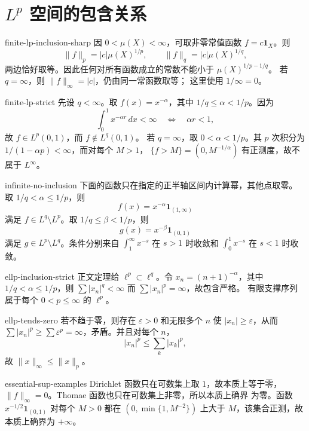 \chapter{\texorpdfstring{\(L^p\)}{Lp} 空间的包含关系}

\begin{solution}{finite-lp-inclusion-sharp}
因 \(0<\mu(X)<\infty\)，可取非零常值函数
\(f=c\mathbf1_X\)。则
\[
 \|f\|_p=|c|\mu(X)^{1/p},\qquad
 \|f\|_q=|c|\mu(X)^{1/q},
\]
两边恰好取等。因此任何对所有函数成立的常数不能小于
\(\mu(X)^{1/p-1/q}\)。
若 \(q=\infty\)，则 \(\|f\|_\infty=|c|\)，仍由同一常函数取等；
这里使用 \(1/\infty=0\)。
\end{solution}

\begin{solution}{finite-lp-strict}
先设 \(q<\infty\)。取 \(f(x)=x^{-\alpha}\)，其中
\(1/q\le\alpha<1/p\)。因为
\[
 \int_0^1x^{-\alpha r}\,dx<\infty
\quad\Longleftrightarrow\quad \alpha r<1,
\]
故 \(f\in L^p(0,1)\)，而 \(f\notin L^q(0,1)\)。
若 \(q=\infty\)，取 \(0<\alpha<1/p\)。其 \(p\) 次积分为
\(1/(1-\alpha p)<\infty\)，而对每个 \(M>1\)，
\(\{f>M\}=(0,M^{-1/\alpha})\) 有正测度，故不属于 \(L^\infty\)。
\end{solution}

\begin{solution}{infinite-no-inclusion}
下面的函数只在指定的正半轴区间内计算幂，其他点取零。
取 \(1/q<\alpha\le1/p\)，则
\[
 f(x)=x^{-\alpha}\mathbf1_{(1,\infty)}
\]
满足 \(f\in L^q\setminus L^p\)。取
\(1/q\le\beta<1/p\)，则
\[
 g(x)=x^{-\beta}\mathbf1_{(0,1)}
\]
满足 \(g\in L^p\setminus L^q\)。条件分别来自
\(\int_1^\infty x^{-s}\) 在 \(s>1\) 时收敛和
\(\int_0^1x^{-s}\) 在 \(s<1\) 时收敛。
\end{solution}

\begin{solution}{ellp-inclusion-strict}
正文定理给 \(\ell^p\subset\ell^q\)。令
\(x_n=(n+1)^{-\alpha}\)，其中
\(1/q<\alpha\le1/p\)，则
\(\sum|x_n|^q<\infty\) 而 \(\sum|x_n|^p=\infty\)，故包含严格。
有限支撑序列属于每个 \(0<p\le\infty\) 的 \(\ell^p\)。
\end{solution}

\begin{solution}{ellp-tends-zero}
若不趋于零，则存在 \(\varepsilon>0\) 和无限多个 \(n\) 使
\(|x_n|\ge\varepsilon\)，从而
\(\sum|x_n|^p\ge\sum\varepsilon^p=\infty\)，矛盾。并且对每个 \(n\)，
\[
 |x_n|^p\le\sum_k|x_k|^p,
\]
故 \(\|x\|_\infty\le\|x\|_p\)。
\end{solution}

\begin{solution}{essential-sup-examples}
Dirichlet 函数只在可数集上取 \(1\)，故本质上等于零，
\(\|f\|_\infty=0\)。Thomae 函数也只在可数集上非零，所以本质上确界
为零。函数 \(x^{-1/2}\mathbf1_{(0,1)}\) 对每个 \(M>0\) 都在
\((0,\min\{1,M^{-2}\})\) 上大于 \(M\)，该集合正测，故本质上确界为
\(+\infty\)。
\end{solution}

